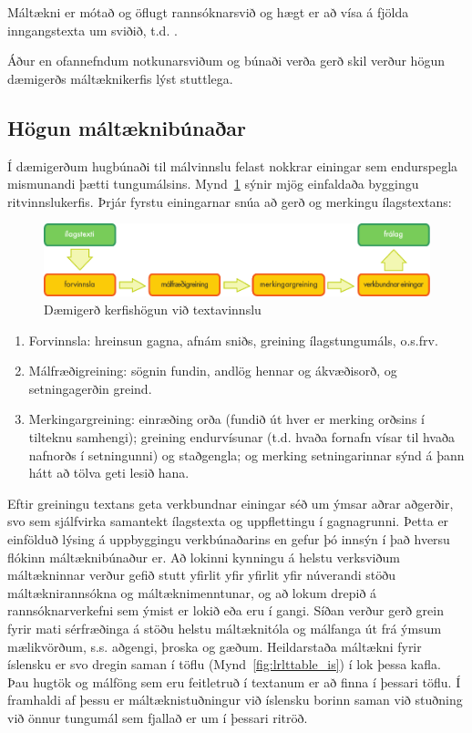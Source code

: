 \documentclass{../../metanetpaper}
\begin{document}
\begin{multicols}{2}
Máltækni er mótað og öflugt rannsóknarsvið og hægt er að vísa á fjölda inngangstexta um sviðið, t.d. \cite{carstensen-etal1, jurafsky-martin01, manning-schuetze1, lt-world1, lt-survey1}.

Áður en ofannefndum notkunarsviðum og búnaði verða gerð skil verður högun dæmigerðs máltæknikerfis lýst stuttlega.

\subsection{Högun máltæknibúnaðar}

Í dæmigerðum hugbúnaði til málvinnslu felast nokkrar einingar sem endurspegla mismunandi þætti tungumálsins. Mynd~\ref{fig:textprocessingarch_is} sýnir mjög einfaldaða byggingu ritvinnslukerfis. Þrjár fyrstu einingarnar snúa að gerð og merkingu ílagstextans: 

\begin{figure}[b]
  \center
  \includegraphics[width=\textwidth]{../_media/icelandic/text_processing_app_architecture}
  \caption{Dæmigerð kerfishögun við textavinnslu}
  \label{fig:textprocessingarch_is}
\end{figure}

\begin{enumerate}
\item Forvinnsla: hreinsun gagna, afnám sniðs, greining ílagstungumáls, o.s.frv.
\item Málfræðigreining: sögnin fundin, andlög hennar og ákvæðisorð, og setningagerðin greind.
\item Merkingargreining: einræðing orða (fundið út hver er merking orðsins í tilteknu samhengi); greining endurvísunar (t.d. hvaða fornafn vísar til hvaða nafnorðs í setningunni) og staðgengla; og merking setningarinnar sýnd á þann hátt að tölva geti lesið hana.
\end{enumerate}

Eftir greiningu textans geta verkbundnar einingar séð um ýmsar aðrar aðgerðir, svo sem sjálfvirka samantekt ílagstexta og uppflettingu í gagnagrunni. Þetta er einfölduð lýsing á uppbyggingu verkbúnaðarins en gefur þó innsýn í það hversu flókinn máltæknibúnaður er. 
Að lokinni kynningu á helstu verksviðum máltækninnar verður gefið stutt yfirlit yfir yfirlit yfir núverandi stöðu máltæknirannsókna og máltæknimenntunar, og að lokum drepið á rannsóknarverkefni sem ýmist er lokið eða eru í gangi. Síðan verður gerð grein fyrir mati sérfræðinga á stöðu helstu máltæknitóla og málfanga út frá ýmsum mælikvörðum, s.s. aðgengi, þroska og gæðum. Heildarstaða máltækni fyrir íslensku er svo dregin saman í töflu (Mynd~\ref{fig:lrlttable_is}) í lok þessa kafla. Þau hugtök og málföng sem eru feitletruð í textanum er að finna í þessari töflu. Í framhaldi af þessu er máltæknistuðningur við íslensku borinn saman við stuðning við önnur tungumál sem fjallað er um í þessari ritröð.


\end{multicols}
\end{document}
